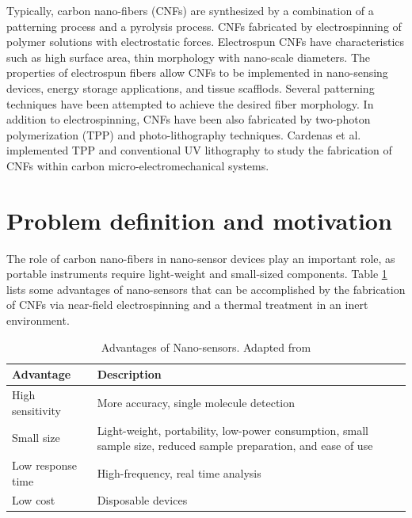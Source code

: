 Typically, carbon nano-fibers (CNFs) are synthesized by a combination of a patterning process and a pyrolysis process. CNFs fabricated by electrospinning of polymer solutions with electrostatic forces. Electrospun CNFs have characteristics such as high surface area, thin morphology with nano-scale diameters. The properties of electrospun fibers allow CNFs to be implemented in nano-sensing devices, energy storage applications, and tissue scafflods. \cite{Khanna2016, Ramakrishna2005, Reneker2000, Norris2000, Vozzi2002, Kim2003, Dersch2005} Several patterning techniques have been attempted to achieve the desired fiber morphology. In addition to electrospinning, CNFs have been also fabricated by two-photon polymerization (TPP) and photo-lithography techniques. \cite{CardenasBenitez2019} Cardenas et al. implemented TPP and conventional UV lithography to study the fabrication of CNFs within carbon micro-electromechanical systems.

\section{Problem definition and motivation}


The role of carbon nano-fibers in nano-sensor devices play an important role, as portable instruments require light-weight and small-sized components. \cite{Khanna2016} Table \ref{tab:advantagesOfNanosensors} lists some advantages of nano-sensors that can be accomplished by the fabrication of CNFs via near-field electrospinning and a thermal treatment in an inert environment.

\begin{table}[ht]
\centering
\caption[Advantages of Nano-sensors]{Advantages of Nano-sensors. Adapted from \cite{Khanna2016}}
\begin{tabularx}{\textwidth}{lX}
\hline
\textbf{Advantage} & \textbf{Description} \\
\hline
High sensitivity & More accuracy, single molecule detection \\
Small size & Light-weight, portability, low-power consumption, small sample size, reduced sample preparation, and ease of use \\
Low response time & High-frequency, real time analysis \\
Low cost & Disposable devices \\
\hline
\end{tabularx}
\label{tab:advantagesOfNanosensors}
\end{table}

